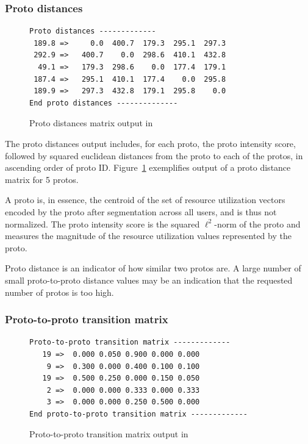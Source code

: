 \documentclass[]{article}
\begin{document}
\subsubsection{Proto distances}
\label{sec:usage:orion:dist}

\begin{figure}[h] 
\small
\begin{Verbatim}[frame=single]
Proto distances -------------
 189.8 =>     0.0  400.7  179.3  295.1  297.3
 292.9 =>   400.7    0.0  298.6  410.1  432.8
  49.1 =>   179.3  298.6    0.0  177.4  179.1
 187.4 =>   295.1  410.1  177.4    0.0  295.8
 189.9 =>   297.3  432.8  179.1  295.8    0.0
End proto distances --------------
\end{Verbatim}
\caption{Proto distances matrix output in \orionp}
\label{fig:verb:dist}
\end{figure}

The proto distances output includes, for each proto, the proto intensity score,
followed by squared euclidean distances from the proto to each of the protos, in
ascending order of proto ID. Figure~\ref{fig:verb:dist} exemplifies output of a
proto distance matrix for 5 protos.

A proto is, in essence, the centroid of the set of resource utilization vectors
encoded by the proto after segmentation across all users, and is thus not
normalized. The proto intensity score is the squared $\ell^2$-norm of the proto
and measures the magnitude of the resource utilization values represented by the
proto.

Proto distance is an indicator of how similar two protos are. A large number of
small proto-to-proto distance values may be an indication that the requested
number of protos is too high.

\subsubsection{Proto-to-proto transition matrix}
\label{sec:usage:orion:p2pt}

\begin{figure}[h] 
\small
\begin{Verbatim}[frame=single]
Proto-to-proto transition matrix -------------
   19 =>  0.000 0.050 0.900 0.000 0.000
    9 =>  0.300 0.000 0.400 0.100 0.100
   19 =>  0.500 0.250 0.000 0.150 0.050
    2 =>  0.000 0.000 0.333 0.000 0.333
    3 =>  0.000 0.000 0.250 0.500 0.000
End proto-to-proto transition matrix -------------
\end{Verbatim}
\caption{Proto-to-proto transition matrix output in \orionp}
\label{fig:verb:p2pt}
\end{figure}
\end{document}
